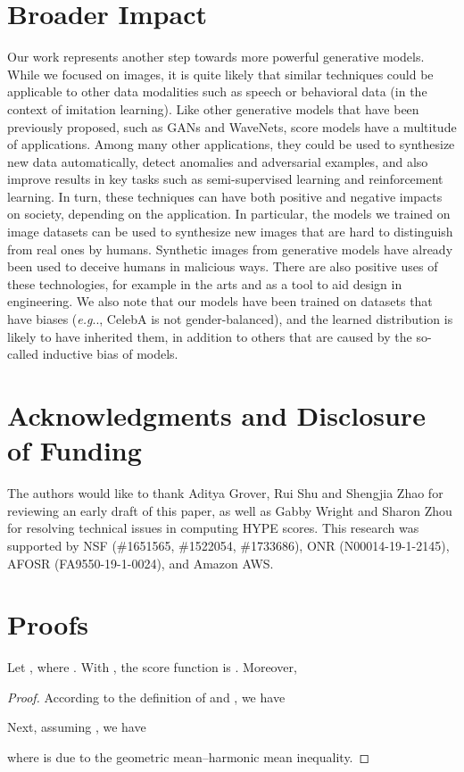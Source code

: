 \documentclass{article}
\makeatletter
\newenvironment{customprop}[1]
{\renewcommand\theinnercustomprop{#1}\innercustomprop}
{\endinnercustomprop}
\def\@onedot{\ifx\@let@token.\else.\null\fi\xspace}
\DeclareRobustCommand\onedot{\futurelet\@let@token\@onedot}
\def\eg{\emph{e.g}\onedot}
\makeatother
\begin{document}
\section*{Broader Impact}
Our work represents another step towards more powerful generative models. While we focused on images, it is quite likely that similar techniques could be applicable to other data modalities such as speech or behavioral data (in the context of imitation learning). Like other generative models that have been previously proposed, such as GANs and WaveNets, score models have a multitude of applications. Among many other applications, they could be used to synthesize new data automatically, detect anomalies and adversarial examples, and also improve results in key tasks such as semi-supervised learning and reinforcement learning. In turn, these techniques can have both positive and negative impacts on society, depending on the application. In particular, the models we trained on image datasets can be used to synthesize new images that are hard to distinguish from real ones by humans. Synthetic images from generative models have already been used to deceive humans in malicious ways. There are also positive uses of these technologies, for example in the arts and as a tool to aid design in engineering. We also note that our models have been trained on datasets that have biases (\eg, CelebA is not gender-balanced), and the learned distribution is likely to have inherited them, in addition to others that are caused by the so-called inductive bias of models.

\section*{Acknowledgments and Disclosure of Funding}
The authors would like to thank Aditya Grover, Rui Shu and Shengjia Zhao for reviewing an early draft of this paper, as well as Gabby Wright and Sharon Zhou for resolving technical issues in computing HYPE scores. This research was supported by NSF (\#1651565, \#1522054, \#1733686), ONR  (N00014-19-1-2145), AFOSR (FA9550-19-1-0024), and Amazon AWS. 




\clearpage
\appendix
\section{Proofs}\label{app:proofs}
\begin{customprop}{\ref{prop:init_noise}}
Let , where . With , the score function is . Moreover,

\end{customprop}
\begin{proof}
According to the definition of  and , we have

Next, assuming , we have

where  is due to the geometric mean--harmonic mean inequality.
\end{proof}
\end{document}
